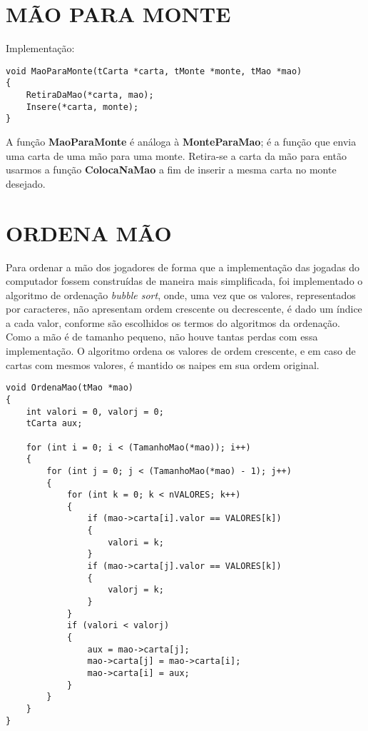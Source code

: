 \documentclass[12pt, oneside, a4paper, brazil]{abntex2}
\begin{document}
\section{MÃO PARA MONTE}\label{se:implementaçãoMaoParaMonte}
Implementação:
\begin{lstlisting}
void MaoParaMonte(tCarta *carta, tMonte *monte, tMao *mao)
{
    RetiraDaMao(*carta, mao);
    Insere(*carta, monte);
}
\end{lstlisting}

A função \textbf{MaoParaMonte} é análoga à \textbf{MonteParaMao}; é a função que envia uma carta de uma mão para uma monte. Retira-se a carta da mão para então usarmos a função \textbf{ColocaNaMao} a fim de inserir a mesma carta no monte desejado.

\section{ORDENA MÃO} \label{se:ordenamao}

Para ordenar a mão dos jogadores de forma que a implementação das jogadas do computador fossem construídas de maneira mais simplificada, foi implementado o algoritmo de ordenação \textit{bubble sort}, onde, uma vez que os valores, representados por caracteres, não apresentam ordem crescente ou decrescente, é dado um índice a cada valor, conforme são escolhidos os termos do algoritmos da ordenação. Como a mão é de tamanho pequeno, não houve tantas perdas com essa implementação.
O algoritmo ordena os valores de ordem crescente, e em caso de cartas com mesmos valores, é mantido os naipes em sua ordem original.

\begin{lstlisting}
void OrdenaMao(tMao *mao)
{
    int valori = 0, valorj = 0;
    tCarta aux;

    for (int i = 0; i < (TamanhoMao(*mao)); i++)
    {
        for (int j = 0; j < (TamanhoMao(*mao) - 1); j++)
        {
            for (int k = 0; k < nVALORES; k++)
            {
                if (mao->carta[i].valor == VALORES[k])
                {
                    valori = k;
                }
                if (mao->carta[j].valor == VALORES[k])
                {
                    valorj = k;
                }
            }
            if (valori < valorj)
            {
                aux = mao->carta[j];
                mao->carta[j] = mao->carta[i];
                mao->carta[i] = aux;
            }
        }
    }
}
\end{lstlisting}
\end{document}
